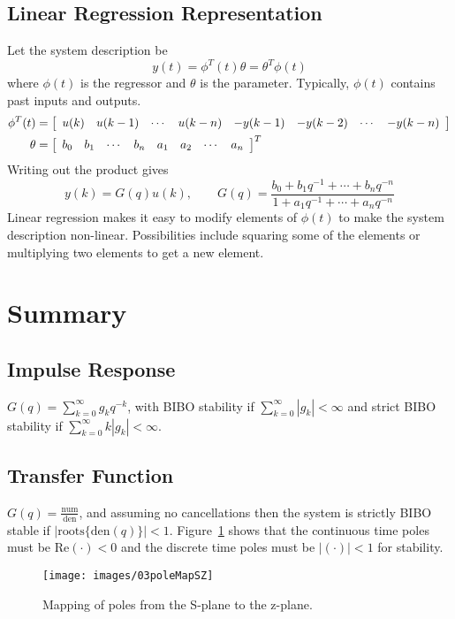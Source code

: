 \subsection{Linear Regression Representation}
\label{sec:linearregression}
Let the system description be
$$y(t)=\phi^T(t)\theta = \theta^T\phi(t)$$
where $\phi(t)$ is the regressor and $\theta$ is the parameter.
Typically, $\phi(t)$ contains past inputs and outputs.
\begin{align*}
\phi^T(t) &= \left[\begin{array}{c c c c c c c c}
u(k) & u(k-1) & \cdots & u(k-n) & -y(k-1) & -y(k-2) & \cdots & -y(k-n) \end{array}\right] \\
\theta{} &= \left[\begin{array}{c c c c c c c c}
b_0 & b_1 & \cdots & b_n & a_1 & a_2 & \cdots & a_n \end{array}\right]^T
\end{align*}
Writing out the product gives
$$y(k) = G(q)u(k), \qquad G(q) = \frac{b_0+b_1 q^{-1}+\cdots+b_n q^{-n}}{1+a_1 q^{-1}+\cdots+a_n q^{-n}}$$
Linear regression makes it easy to modify elements of $\phi(t)$ to make the system description non-linear.
Possibilities include squaring some of the elements or multiplying two elements to get a new element.

\section{Summary}
\subsection{Impulse Response}
$G(q) = \sum_{k=0}^\infty g_k q^{-k}$, with BIBO stability if $\sum_{k=0}^\infty |g_k| < \infty$ and strict BIBO stability if $\sum_{k=0}^\infty k|g_k| < \infty$.

\subsection{Transfer Function}
$G(q) = \frac{\text{num}}{\text{den}}$, and assuming no cancellations then the system is strictly BIBO stable if $|\text{roots}\lbrace \text{den}(q)\rbrace|<1$.
Figure~\ref{fig:03poleMapSZ} shows that the continuous time poles must be $\text{Re}(\cdot) < 0$ and the discrete time poles must be $|(\cdot)| < 1$ for stability.
\begin{figure}[ht!]
\centering
\texttt{[image: images/03poleMapSZ]}
\caption{Mapping of poles from the S-plane to the z-plane.}
\label{fig:03poleMapSZ}
\end{figure}

